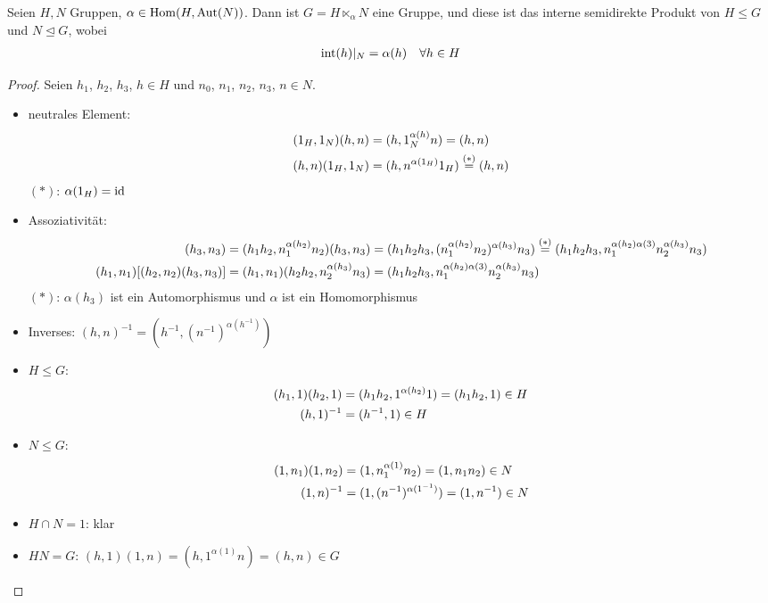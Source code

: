 \begin{proposition}
	Seien $H,N$ Gruppen, $\alpha\in\operatorname{Hom}(H,\operatorname{Aut}(N))$. Dann ist $G=H\ltimes_{\alpha} N$ eine Gruppe, und diese ist das interne semidirekte Produkt von $H\le G$ und $N\unlhd G$, wobei
	\begin{align}
		\operatorname{int}(h)\vert_N = \alpha(h)\quad\forall h\in H\notag
	\end{align}
\end{proposition}
\begin{proof}
	Seien $h_1$, $h_2$, $h_3$, $h\in H$ und $n_0$, $n_1$, $n_2$, $n_3$, $n\in N$.
	\begin{itemize}
		\item neutrales Element: 
		\begin{align}
			(1_H,1_N)(h,n) &= (h,1_N^{\alpha(h)}n) = (h,n) \notag \\
			(h,n)(1_H,1_N) &= (h,n^{\alpha(1_H)}1_H) \overset{(\ast)}{=} (h,n) \notag
		\end{align}
		$(\ast)$: $\alpha(1_H)=\operatorname{id}$
		\item Assoziativität:
		\begin{align}
			[(h_1,n_1)(h_2,n_2)](h_3,n_3) &= (h_1h_2,n_1^{\alpha(h_2)}n_2)(h_3,n_3) = (h_1h_2h_3,(n_1^{\alpha(h_2)}n_2)^{\alpha(h_3)}n_3) \overset{(\ast)}{=} (h_1h_2h_3,n_1^{\alpha(h_2)\alpha(3)}n_2^{\alpha(h_3)}n_3) \notag \\
			(h_1,n_1)[(h_2,n_2)(h_3,n_3)] &= (h_1,n_1)(h_2h_2,n_2^{\alpha(h_3)}n_3) = (h_1h_2h_3,n_1^{\alpha(h_2)\alpha(3)}n_2^{\alpha(h_3)}n_3) \notag
		\end{align}
		$(\ast)$: $\alpha(h_3)$ ist ein Automorphismus und $\alpha$ ist ein Homomorphismus
		\item Inverses: $(h,n)^{-1}=(h^{-1},(n^{-1})^{\alpha(h^{-1})})$
		\item $H\le G$:
		\begin{align}
			(h_1,1)(h_2,1) &= (h_1h_2,1^{\alpha(h_2)}1) = (h_1h_2,1)\in H \notag \\
			(h,1)^{-1} &= (h^{-1},1)\in H \notag
		\end{align}
		\item $N\le G$:
		\begin{align}
			(1,n_1)(1,n_2) &= (1,n_1^{\alpha(1)}n_2) = (1,n_1n_2)\in N \notag \\
			(1,n)^{-1} &= (1,(n^{-1})^{\alpha(1^{-1})}) = (1,n^{-1})\in N \notag
		\end{align}
		\item $H\cap N=1$: klar
		\item $HN=G$: $(h,1)(1,n)=(h,1^{\alpha(1)}n)=(h,n)\in G$

\end{itemize}
\end{proof}
